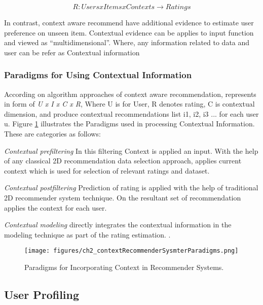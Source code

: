 \begin{equation} 
R : Users x Items x Contexts \rightarrow Ratings
\end{equation}

In contrast, context aware recommend have additional evidence to estimate user preference on unseen item. Contextual evidence can be applies to input function and viewed as “multidimensional”. Where, any information related to data and user can be refer as Contextual information

\subsubsection{Paradigms for Using Contextual Information}

According on algorithm approaches of context aware recommendation, represents in form of \textit{U x I x C x R}, Where U is for User, R denotes rating, C is contextual dimension, and produce contextual recommendations list i1, i2, i3 ... for each user u. Figure \ref{fig:ch2_contextRecommenderSysmterParadigms} illustrates the Paradigms used in processing Contextual Information. These are categories as follows:\newline

\textit{Contextual prefiltering} In this filtering Context is applied an input. With the help of any classical 2D recommendation data selection approach, applies current context which is used for selection of relevant ratings and dataset.\newline

\textit{Contextual postfiltering} Prediction of rating is applied with the help of traditional 2D recommender system technique. On the resultant set of recommendation applies the context for each user. \newline

\textit{Contextual modeling} directly integrates the contextual information in the modeling technique as part of the rating estimation. .\newline


\begin{figure}[h]
	\centering
	\texttt{[image: figures/ch2\_contextRecommenderSysmterParadigms.png]}
	\caption{Paradigms for Incorporating Context in Recommender Systems.}
	\cite[Adomavicius, 2011]{adomavicius2011context}
	\label{fig:ch2_contextRecommenderSysmterParadigms}
\end{figure}


\subsection{User Profiling}

